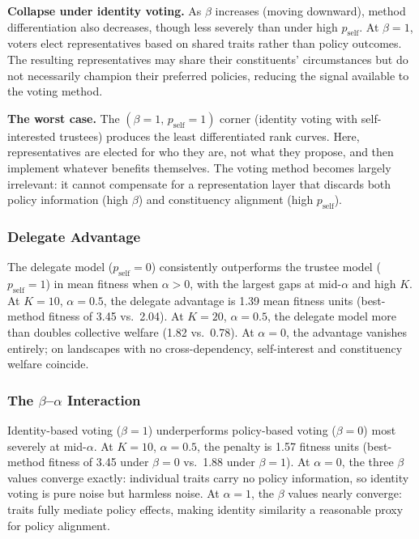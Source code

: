\textbf{Collapse under identity voting.} As $\beta$ increases (moving downward), method differentiation also decreases, though less severely than under high $p_{\mathrm{self}}$. At $\beta = 1$, voters elect representatives based on shared traits rather than policy outcomes. The resulting representatives may share their constituents' circumstances but do not necessarily champion their preferred policies, reducing the signal available to the voting method.

\textbf{The worst case.} The $(\beta = 1,\, p_{\mathrm{self}} = 1)$ corner (identity voting with self-interested trustees) produces the least differentiated rank curves. Here, representatives are elected for who they are, not what they propose, and then implement whatever benefits themselves. The voting method becomes largely irrelevant: it cannot compensate for a representation layer that discards both policy information (high $\beta$) and constituency alignment (high $p_{\mathrm{self}}$).

\subsubsection{Delegate Advantage}

The delegate model ($p_{\mathrm{self}} = 0$) consistently outperforms the trustee model ($p_{\mathrm{self}} = 1$) in mean fitness when $\alpha > 0$, with the largest gaps at mid-$\alpha$ and high $K$. At $K = 10$, $\alpha = 0.5$, the delegate advantage is 1.39 mean fitness units (best-method fitness of 3.45 vs.\ 2.04). At $K = 20$, $\alpha = 0.5$, the delegate model more than doubles collective welfare (1.82 vs.\ 0.78). At $\alpha = 0$, the advantage vanishes entirely; on landscapes with no cross-dependency, self-interest and constituency welfare coincide.

\subsubsection{The $\beta$--$\alpha$ Interaction}

Identity-based voting ($\beta = 1$) underperforms policy-based voting ($\beta = 0$) most severely at mid-$\alpha$. At $K = 10$, $\alpha = 0.5$, the penalty is 1.57 fitness units (best-method fitness of 3.45 under $\beta = 0$ vs.\ 1.88 under $\beta = 1$). At $\alpha = 0$, the three $\beta$ values converge exactly: individual traits carry no policy information, so identity voting is pure noise but harmless noise. At $\alpha = 1$, the $\beta$ values nearly converge: traits fully mediate policy effects, making identity similarity a reasonable proxy for policy alignment.

